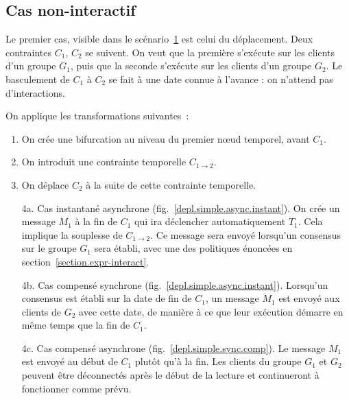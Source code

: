 \documentclass{article}
\newcommand\timenode{nœud temporel\xspace}
\begin{document}
\subsection{Cas non-interactif}
Le premier cas, visible dans le scénario~\ref{scenar.simple} est celui du déplacement.
Deux contraintes $C_1$, $C_2$ se suivent. 
On veut que la première s'exécute sur les clients d'un groupe $G_1$, puis que la seconde s'exécute sur les clients d'un groupe $G_2$. 
Le basculement de $C_1$ à $C_2$ se fait à une date connue à l'avance : on n'attend pas d'interactions.

\begin{figure}[h]
    \centering
    \begin{tikzpicture}
    
    \end{tikzpicture}
    \label{scenar.simple}
\end{figure} 

On applique les transformations suivantes~: 
\begin{enumerate}
    \item On crée une bifurcation au niveau du premier \timenode, avant $C_1$.
    \item On introduit une contrainte temporelle $C_{1\rightarrow2}$.
    \item On déplace $C_2$ à la suite de cette contrainte temporelle.
    \item[4a.] Cas instantané asynchrone (fig.~\ref{depl.simple.async.instant}).
    On crée un message $M_1$ à la fin de $C_1$ qui ira déclencher automatiquement $T_1$. 
    Cela implique la souplesse de $C_{1\rightarrow2}$.
    Ce message sera envoyé lorsqu'un consensus sur le groupe $G_1$ sera établi, avec une des politiques énoncées en section~\ref{section.expr-interact}.
    \item[4b.] Cas compensé synchrone (fig.~\ref{depl.simple.async.instant}).
    Lorsqu'un consensus est établi sur la date de fin de $C_1$, un message $M_1$ est envoyé aux clients de $G_2$ avec cette date, de manière à ce que leur exécution démarre en même temps que la fin de $C_1$.
    \item[4c.] Cas compensé asynchrone (fig.~\ref{depl.simple.sync.comp}). 
    Le message $M_1$ est envoyé au début de $C_1$ plutôt qu'à la fin.
    Les clients du groupe $G_1$ et $G_2$ peuvent être déconnectés après le début de la lecture et continueront à fonctionner comme prévu.
\end{enumerate}
\end{document}
